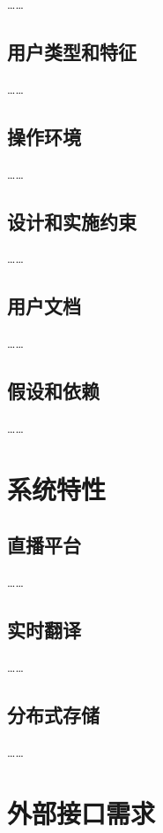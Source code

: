 ……

\section{用户类型和特征}

……

\section{操作环境}

……

\section{设计和实施约束}

……

\section{用户文档}

……

\section{假设和依赖}

……


\newpage

\chapter{系统特性}
\label{ch:system-feature}

\section{直播平台}

……

\section{实时翻译}

……

\section{分布式存储}

……


\newpage


\chapter{外部接口需求}
\label{ch:outer-interface}


